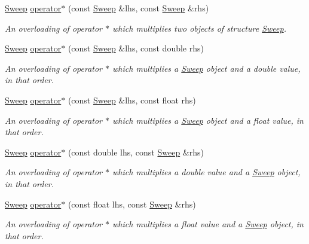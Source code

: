 \begin{DoxyCompactItemize}
\hyperlink{structSweep}{Sweep} \hyperlink{structSweep_a4739da92a36e5f8f17b0be140dd327f6}{operator$\ast$} (const \hyperlink{structSweep}{Sweep} \&lhs, const \hyperlink{structSweep}{Sweep} \&rhs)
\begin{DoxyCompactList}\small\item\em An overloading of operator $\ast$ which multiplies two objects of structure {\itshape \hyperlink{structSweep}{Sweep}}. \end{DoxyCompactList}\item 
\hyperlink{structSweep}{Sweep} \hyperlink{structSweep_a7433bef86618608850b1a899ac50b08f}{operator$\ast$} (const \hyperlink{structSweep}{Sweep} \&lhs, const double rhs)
\begin{DoxyCompactList}\small\item\em An overloading of operator $\ast$ which multiplies a {\itshape \hyperlink{structSweep}{Sweep}} object and a {\itshape double} value, in that order. \end{DoxyCompactList}\item 
\mbox{\label{structSweep_a12c1f3e5e4869781ca7d90a50f334606}} 
\hyperlink{structSweep}{Sweep} \hyperlink{structSweep_a12c1f3e5e4869781ca7d90a50f334606}{operator$\ast$} (const \hyperlink{structSweep}{Sweep} \&lhs, const float rhs)
\begin{DoxyCompactList}\small\item\em An overloading of operator $\ast$ which multiplies a {\itshape \hyperlink{structSweep}{Sweep}} object and a {\itshape float} value, in that order. \end{DoxyCompactList}\item 
\hyperlink{structSweep}{Sweep} \hyperlink{structSweep_a824c559a841ab3db60f51afb2d2233c9}{operator$\ast$} (const double lhs, const \hyperlink{structSweep}{Sweep} \&rhs)
\begin{DoxyCompactList}\small\item\em An overloading of operator $\ast$ which multiplies a {\itshape double} value and a {\itshape \hyperlink{structSweep}{Sweep}} object, in that order. \end{DoxyCompactList}\item 
\mbox{\label{structSweep_ad4aac4ab6e7ea49d5bc9ebfa83eb07be}} 
\hyperlink{structSweep}{Sweep} \hyperlink{structSweep_ad4aac4ab6e7ea49d5bc9ebfa83eb07be}{operator$\ast$} (const float lhs, const \hyperlink{structSweep}{Sweep} \&rhs)
\begin{DoxyCompactList}\small\item\em An overloading of operator $\ast$ which multiplies a {\itshape float} value and a {\itshape \hyperlink{structSweep}{Sweep}} object, in that order. \end{DoxyCompactList}\item 

\end{DoxyCompactItemize}
